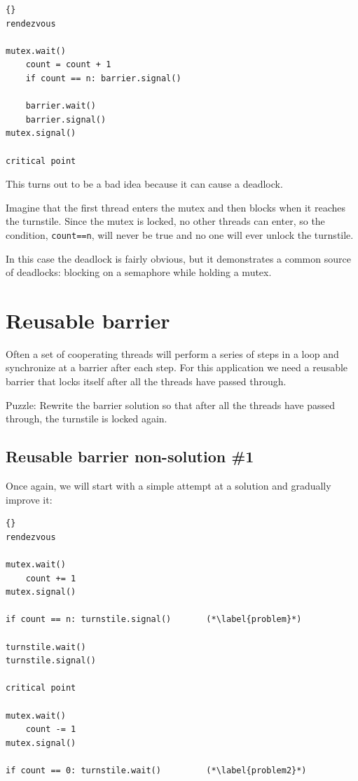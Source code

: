\documentclass{book}
\newcommand{\clearemptydoublepage}{\newpage\cleardoublepage}
\begin{document}
\begin{lstlisting}[title={Bad barrier solution}]{}
rendezvous

mutex.wait()
    count = count + 1
    if count == n: barrier.signal()

    barrier.wait()
    barrier.signal()
mutex.signal()

critical point
\end{lstlisting}

This turns out to be a bad idea because it can cause a
deadlock.

Imagine that the first thread enters the
mutex and then blocks when it reaches the turnstile.
Since the mutex is locked, no other threads can enter,
so the condition, {\tt count==n}, will never be true and
no one will ever unlock the turnstile.

In this case the deadlock is fairly obvious, but it
demonstrates a
common source of deadlocks: blocking on a semaphore while
holding a mutex.


\section {Reusable barrier}
\label{rebar}

Often a set of cooperating threads will perform a series of steps
in a loop and synchronize at a barrier after each step.  For this
application we need a reusable barrier that locks itself after
all the threads have passed through.

Puzzle: Rewrite the barrier solution so that after all the threads
have passed through, the turnstile is locked again.


\clearemptydoublepage
\subsection {Reusable barrier non-solution \#1}

Once again, we will start with a simple attempt at a solution
and gradually improve it:

\begin{lstlisting}[title={Reusable barrier non-solution}]{}
rendezvous

mutex.wait()
    count += 1
mutex.signal()

if count == n: turnstile.signal()       (*\label{problem}*)

turnstile.wait()
turnstile.signal()

critical point

mutex.wait()
    count -= 1
mutex.signal()

if count == 0: turnstile.wait()         (*\label{problem2}*)
\end{lstlisting}
\end{document}
